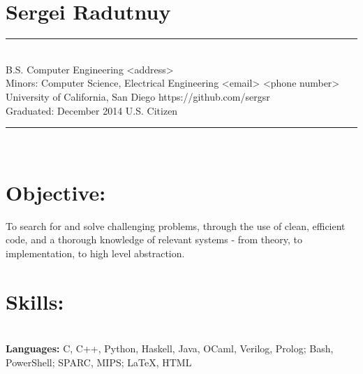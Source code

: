 \documentclass{article}
\begin{document}
\section*{Sergei Radutnuy}

	\noindent\rule{575pt}{0.5pt} \\
	\indent B.S. Computer Engineering \hfill <address>
          \\
	\indent Minors: Computer Science, Electrical Engineering
  \hspace{256.5pt} <email> <phone number>\\
	\indent University of California, San Diego
  \hspace{220.5pt} https://github.com/sergsr \\
	\indent Graduated: December 2014
  \hspace{217.5pt} U.S. Citizen   \\
	\noindent\rule{575pt}{0.5pt} \\

\section*{Objective:}
\begin{spacing}{1.0}
	\indent To search for and solve challenging problems, through the use of clean, efficient code, and a
			thorough knowledge of relevant
	\indent systems - from theory, to implementation, to high level abstraction.
\end{spacing}

\section*{Skills:}
\hspace{1pt}\\
\indent \textbf{Languages:}
C, C++, Python, Haskell, Java, OCaml, Verilog, Prolog; Bash, PowerShell; SPARC,
MIPS; \LaTeX, HTML\\
\end{document}
